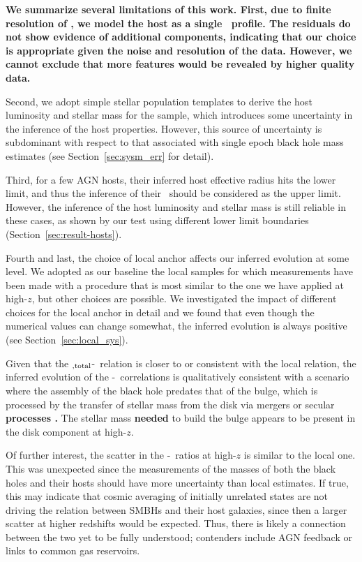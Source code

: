 \documentclass[apj]{emulateapj}
\begin{document}
{\bf We summarize several limitations of this work. First, due to finite resolution of \hst, we model the host as a single \sersic\ profile. The residuals do not show evidence of additional components, indicating that our choice is appropriate given the noise and resolution of the data. However, we cannot exclude that more features would be revealed by higher quality data.

Second, we adopt simple stellar population templates to derive the host luminosity and stellar mass for the sample, which introduces some uncertainty in the inference of the host properties. However, this source of uncertainty is subdominant with respect to that associated with single epoch black hole mass estimates (see Section~\ref{sec:sysm_err} for detail). 

Third, for a few AGN hosts, their inferred host effective radius hits the lower limit, and thus the inference of their \Reff\ should be considered as the upper limit. However, the inference of the host luminosity and stellar mass is still reliable in these cases, as shown by our test using different lower limit boundaries (Section~\ref{sec:result-hosts}). 

Fourth and last, the choice of local anchor affects our inferred evolution at some level.  We adopted as our baseline the local samples for which measurements have been made with a procedure that is most similar to the one we have applied at high-$z$, but other choices are possible. We investigated the impact of different choices for the local anchor in detail and we found that even though the numerical values can change somewhat, the inferred evolution is always positive  (see Section~\ref{sec:local_sys}).}

Given that the \smass$_{\rm ,total}$-\mbh\ relation is closer to or consistent with the local relation, the inferred evolution of the \bmass-\mbh\ correlations is qualitatively consistent with a scenario where the assembly of the black hole predates that of the bulge, which is processed by the transfer of stellar mass from the disk via mergers or secular {\bf processes \citep{Jah++09,Bennert++2011,SS13}. }The stellar mass {\bf needed} to build the bulge appears to be present in the disk component at high-$z$.

Of further interest, the scatter in the \mbh-\smass\ ratios at high-$z$ is similar to the local one. This was unexpected since the measurements of the masses of both the black holes and their hosts should have more uncertainty than local estimates. If true, this may indicate that cosmic averaging of initially unrelated states \citep{Peng2007} are not driving the relation between SMBHs and their host galaxies, since then a larger scatter at higher redshifts would be expected. Thus, there is likely a connection between the two yet to be fully understood; contenders include AGN feedback or links to common gas reservoirs.
\end{document}
